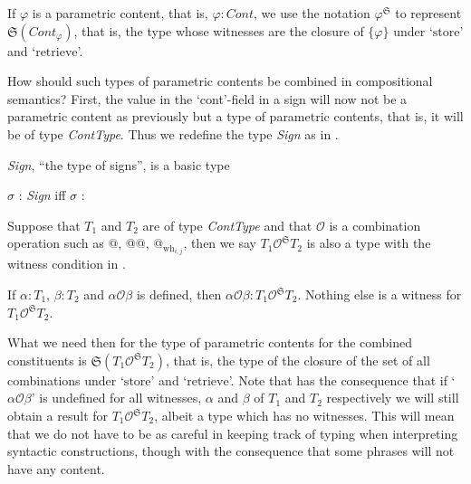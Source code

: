 If $\varphi$ is a parametric content, that is,
$\varphi:\textit{Cont}$, we use the notation $\varphi^{\mathfrak{S}}$
to represent $\mathfrak{S}(\textit{Cont}_{\varphi})$, that is, the type
whose witnesses are the closure of $\{\varphi\}$ under
`$\mathrm{store}$' and `$\mathrm{retrieve}$'.

How should such types of parametric contents be combined in
compositional semantics? First, the value in the `cont'-field in a
sign will now not be a parametric content as previously but a type of
parametric contents, that is, it will be of type \textit{ContType}.
Thus we redefine the type \textit{Sign} as in \nexteg{}.
\begin{ex} 
\begin{subex} 
 
\item \textit{Sign}, ``the type of signs'', is a basic type 
 
\item $\sigma$ : \textit{Sign} iff $\sigma$ :
 
\end{subex} 
   
\end{ex} 
  
  
Suppose that $T_1$ and
$T_2$ are of type \textit{ContType} and that $\mathcal{O}$ is a combination
operation such as @, @@, @$_{\text{wh}_{i,j}}$, then we say $T_1\mathcal{O}^{\mathfrak{S}}T_2$
is also a type with the witness condition in \nexteg{}.
\begin{ex} 
If $\alpha:T_1$, $\beta:T_2$ and $\alpha\mathcal{O}\beta$ is defined,
then $\alpha\mathcal{O}\beta:T_1\mathcal{O}^{\mathfrak{S}}T_2$.
Nothing else is a witness for $T_1\mathcal{O}^{\mathfrak{S}}T_2$. 
\end{ex} 
What we need then for the type of parametric contents for the combined
constituents is
$\mathfrak{S}(T_1\mathcal{O}^{\mathfrak{S}}T_2)$, that
is, the type of the closure of the set of all combinations under
`$\mathrm{store}$' and `$\mathrm{retrieve}$'.  Note that \preveg{} has
the consequence that if `$\alpha\mathcal{O}\beta$' is undefined for all
witnesses, $\alpha$ and $\beta$ of $T_1$ and $T_2$ respectively we
will still obtain a result for $T_1\mathcal{O}^{\mathfrak{S}}T_2$, albeit a
type which has no witnesses.  This will mean that we do not have to be
as careful in keeping track of typing when interpreting syntactic
constructions, though with the consequence that some phrases will not
have any content.

